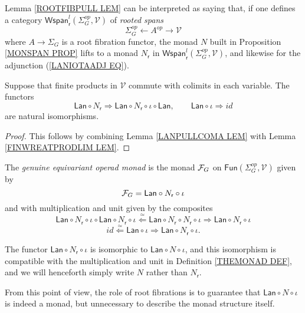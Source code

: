 \documentclass[a4paper,10pt]{article}%
\begin{document}
Lemma \ref{ROOTFIBPULL LEM} can be interpreted as saying that, if one defines a category
$\mathsf{Wspan}^l_{\mathsf{r}}(\Sigma_G^{op},\mathcal{V})$
of \textit{rooted spans}
\[
\Sigma_G^{op} \leftarrow A^{op} \to \mathcal{V}
\]
where $A \to \Sigma_G$ is a root fibration functor, the monad $N$ built in Proposition \ref{MONSPAN PROP} lifts to a monad 
$N_{\mathsf{r}}$ in
$\mathsf{Wspan}^l_{\mathsf{r}}(\Sigma_G^{op},\mathcal{V})$,
and likewise for the adjunction (\ref{LANIOTAADJ EQ}).

\begin{corollary}
  Suppose that finite products in $\mathcal{V}$ commute with colimits in each variable.
  The functors
  \[
  \mathsf{Lan} \circ N_{\mathsf{r}} \Rightarrow
  \mathsf{Lan} \circ N_{\mathsf{r}} \circ \iota \circ \mathsf{Lan},
  \qquad
  \mathsf{Lan} \circ \iota \Rightarrow id
  \]
  are natural isomorphisms.
\end{corollary}

\begin{proof}
  This follows by combining Lemma \ref{LANPULLCOMA LEM} with Lemma \ref{FINWREATPRODLIM LEM}.
\end{proof}


\begin{definition}\label{THEMONAD DEF}
  The \textit{genuine equivariant operad monad} is the monad
  $\mathcal F_G$ on $\mathsf{Fun}(\Sigma_G^{op}, \mathcal{V})$
  given by
  \[
  \mathcal F_G = \mathsf{Lan} \circ N_{\mathsf{r}} \circ \iota
  \]
  and with multiplication and unit given by the composites
  \[
  \mathsf{Lan} \circ N_{\mathsf{r}} \circ \iota \circ
  \mathsf{Lan} \circ N_{\mathsf{r}} \circ \iota
  \overset{\simeq}{\Leftarrow}
  \mathsf{Lan} \circ N_{\mathsf{r}} \circ  N_{\mathsf{r}} \circ \iota
  \Rightarrow
  \mathsf{Lan} \circ N_{\mathsf{r}} \circ \iota
  \]
  \[
  id \overset{\simeq}{\Leftarrow} \mathsf{Lan} \circ \iota
  \Rightarrow
  \mathsf{Lan} \circ N_{\mathsf{r}} \circ \iota.
  \]
\end{definition}


\begin{remark}
  The functor $\mathsf{Lan} \circ N_{\mathsf{r}} \circ \iota$ is isomorphic to 
  $\mathsf{Lan} \circ N \circ \iota$, and this isomorphism is compatible with the multiplication and unit	in Definition \ref{THEMONAD DEF}, and we will henceforth simply write $N$ rather than $N_{\mathsf{r}}$.
  
  From this point of view, the role of root fibrations is to guarantee that $\mathsf{Lan} \circ N \circ \iota$ is indeed a monad, but unnecessary to describe the monad structure itself.
\end{remark}
\end{document}
